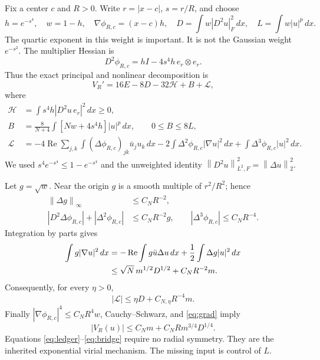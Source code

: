 \documentclass[11pt,a4paper]{article}
\theoremstyle{remark}\newtheorem{remark}[theorem]{Remark}
\newcommand{\dd}{\,dx}
\newcommand{\norm}[1]{\left\|#1\right\|}
\DeclareMathOperator{\Rea}{Re}
\begin{document}
Fix a center $c$ and $R>0$. Write $r=|x-c|$, $s=r/R$, and choose
\begin{equation}\label{eq:weights}
 h=e^{-s^4},\quad w=1-h,\quad \nabla\phi_{R,c}=(x-c)h,\quad
 D=\int w|D^2u|_F^2\dd,\quad L=\int w|u|^p\dd.
\end{equation}
The quartic exponent in this weight is important. It is not the Gaussian weight $e^{-s^2}$. The multiplier Hessian is
\[
 D^2\phi_{R,c}=hI-4s^4h\,e_r\otimes e_r.
\]
Thus the exact principal and nonlinear decomposition is
\begin{equation}\label{eq:ledger}
 V_R'=16E-8D-32\mathcal H+B+\mathcal L,
\end{equation}
where
\begin{align*}
 \mathcal H&=\int s^4h|D^2u\,e_r|^2\dd\ge0,\\
 B&=\frac8{N+4}\int[Nw+4s^4h]|u|^p\dd,\qquad 0\le B\le8L,\\
 \mathcal L&=-4\Rea\sum_{j,k}\int(\Delta\phi_{R,c})_{jk}\bar u_j u_k\dd
 -2\int\Delta^2\phi_{R,c}|\nabla u|^2\dd
 +\int\Delta^3\phi_{R,c}|u|^2\dd.
\end{align*}
We used $s^4e^{-s^4}\le1-e^{-s^4}$ and the unweighted identity
$\norm{D^2u}_{L^2,F}^2=\norm{\Delta u}_2^2$.

Let $g=\sqrt w$. Near the origin $g$ is a smooth multiple of $r^2/R^2$; hence
\begin{align*}
 \norm{\Delta g}_\infty&\le C_NR^{-2},\\
 |D^2\Delta\phi_{R,c}|+|\Delta^2\phi_{R,c}|&\le C_NR^{-2}g,
 \qquad |\Delta^3\phi_{R,c}|\le C_NR^{-4}.
\end{align*}
Integration by parts gives
\begin{align}
 \int g|\nabla u|^2\dd
 &=-\Rea\int g\bar u\Delta u\dd+\frac12\int\Delta g|u|^2\dd\notag\\
 &\le\sqrt N\,m^{1/2}D^{1/2}+C_NR^{-2}m.\label{eq:grad}
\end{align}
Consequently, for every $\eta>0$,
\begin{equation}\label{eq:lower}
 |\mathcal L|\le\eta D+C_{N,\eta}R^{-4}m.
\end{equation}
Finally $|\nabla\phi_{R,c}|^4\le C_NR^4w$, Cauchy--Schwarz, and \eqref{eq:grad} imply
\begin{equation}\label{eq:bridge}
 |V_R(u)|\le C_Nm+C_NR m^{3/4}D^{1/4}.
\end{equation}
Equations \eqref{eq:ledger}--\eqref{eq:bridge} require no radial symmetry. They are the inherited exponential virial mechanism. The missing input is control of $L$.
\end{document}
